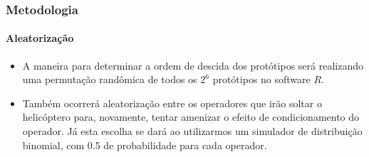 \documentclass{beamer}
\begin{document}
            \begin{frame}
               \frametitle{Metodologia}
                  \framesubtitle{Aleatorização}
                     \begin{itemize}
                        \item A maneira para determinar a ordem de descida dos protótipos será realizando uma permutação randômica de todos os $2^6$ protótipos no software $R$.

                        \item Também ocorrerá aleatorização entre os operadores que irão soltar o helicóptero para, novamente, tentar amenizar o efeito de condicionamento do operador. Já esta escolha se dará ao utilizarmos um simulador de distribuição binomial, com 0.5 de probabilidade para cada operador.
                     \end{itemize}
            \end{frame}
\end{document}
